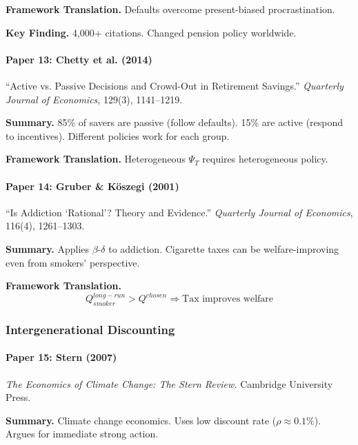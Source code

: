 \textbf{Framework Translation.}
Defaults overcome present-biased procrastination.

\textbf{Key Finding.}
4,000+ citations. Changed pension policy worldwide.

\paragraph{Paper 13: Chetty et al. (2014)}

``Active vs. Passive Decisions and Crowd-Out in Retirement Savings.''
\textit{Quarterly Journal of Economics}, 129(3), 1141--1219.

\textbf{Summary.}
85\% of savers are passive (follow defaults).
15\% are active (respond to incentives).
Different policies work for each group.

\textbf{Framework Translation.}
Heterogeneous $\Psi_T$ requires heterogeneous policy.

\paragraph{Paper 14: Gruber \& Köszegi (2001)}

``Is Addiction `Rational'? Theory and Evidence.''
\textit{Quarterly Journal of Economics}, 116(4), 1261--1303.

\textbf{Summary.}
Applies $\beta$-$\delta$ to addiction. Cigarette taxes can be welfare-improving 
even from smokers' perspective.

\textbf{Framework Translation.}
\begin{equation}
Q^{long-run}_{smoker} > Q^{chosen} \Rightarrow \text{Tax improves welfare}
\end{equation}

\subsubsection{Intergenerational Discounting}

\paragraph{Paper 15: Stern (2007)}

\textit{The Economics of Climate Change: The Stern Review.}
Cambridge University Press.

\textbf{Summary.}
Climate change economics. Uses low discount rate ($\rho \approx 0.1\%$).
Argues for immediate strong action.


